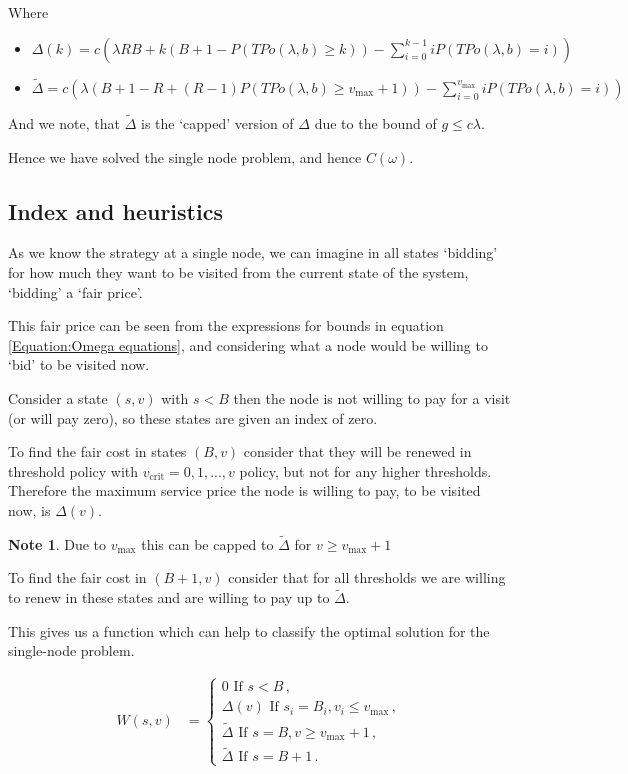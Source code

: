 \documentclass[a4paper,10pt]{article}
\theoremstyle{definition}
\theoremstyle{definition}
\theoremstyle{remark}
\theoremstyle{definition}
\newtheorem*{note}{Note}
\begin{document}
Where
\begin{itemize}
\item $\Delta(k)=c (\lambda R B +k(B+1-P(TPo(\lambda,b) \geq k))-\sum\limits_{i=0}^{k-1} i P(TPo(\lambda,b)=i))$
\item $\widetilde{\Delta}= c  ( \lambda (B+1-R + (R-1) P(TPo(\lambda,b) \geq v_{\text{max}}+1)) - \sum\limits_{i=0}^{v_{\text{max}}} i P(TPo(\lambda,b)=i) )$
\end{itemize}
And we note, that $\widetilde{\Delta}$ is the `capped' version of $\Delta$ due to the bound of $g \leq c \lambda$.

Hence we have solved the single node problem, and hence $C(\omega)$.

\subsection{Index and heuristics}
As we know the strategy at a single node, we can imagine in all states `bidding' for how much they want to be visited from the current state of the system, `bidding' a `fair price'.

This fair price can be seen from the expressions for bounds in equation \ref{Equation:Omega equations}, and considering what a node would be willing to `bid' to be visited now.

Consider a state $(s,v)$ with $s< B$ then the node is not willing to pay for a visit (or will pay zero), so these states are given an index of zero.

To find the fair cost in states $(B,v)$ consider that they will be renewed in threshold policy with $v_{\text{crit}}=0,1,...,v$ policy, but not for any higher thresholds. Therefore the maximum service price the node is willing to pay, to be visited now, is $\Delta(v)$.

\begin{note}
Due to $v_{\text{max}}$ this can be capped to $\widetilde{\Delta}$ for $v \geq v_{\text{max}}+1$
\end{note} 

To find the fair cost in $(B+1,v)$ consider that for all thresholds we are willing to renew  in these states and are willing to pay up to $\widetilde{\Delta}$.

This gives us a function which can help to classify the optimal solution for the single-node problem.

\begin{align*}
W(s,v)&=\begin{cases}
0 \text{ If } s<B \, , \\
\Delta(v) \text{ If } s_{i}=B_{i} , v_{i} \leq v_{\text{max}} \, , \\
\widetilde{\Delta} \text{ If } s=B , v \geq v_{\text{max}}+1 \, , \\
\widetilde{\Delta} \text{ If } s=B+1 \, .
\end{cases}
\end{align*}
\end{document}
